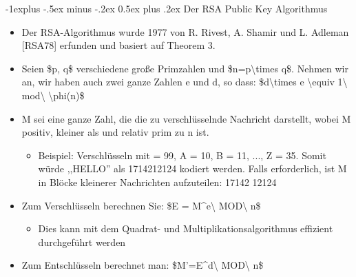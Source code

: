 \documentclass[a4paper]{article}
\makeatletter
\renewcommand{\subsection}{\@startsection{subsection}{2}{0mm}%
 {-1explus -.5ex minus -.2ex}%
 {0.5ex plus .2ex}%
 {\normalfont\normalsize\bfseries}}
\makeatother
\begin{document}
\begin{multicols}{3}
    \subsection{Der RSA Public Key
        Algorithmus}

    \begin{itemize}
        \item
              Der RSA-Algorithmus wurde 1977 von R. Rivest, A. Shamir und L. Adleman
              {[}RSA78{]} erfunden und basiert auf Theorem 3.
        \item
              Seien \$p, q\$ verschiedene große Primzahlen und
              \$n=p\textbackslash times q\$. Nehmen wir an, wir haben auch zwei
              ganze Zahlen e und d, so dass: \$d\textbackslash times e
              \textbackslash equiv 1\textbackslash{} mod\textbackslash{}
              \textbackslash phi(n)\$
        \item
              M sei eine ganze Zahl, die die zu verschlüsselnde Nachricht darstellt,
              wobei M positiv, kleiner als und relativ prim zu n ist.

              \begin{itemize}
                  \item
                        Beispiel: Verschlüsseln mit = 99, A = 10, B = 11, ..., Z = 35. Somit
                        würde ,,HELLO'' als 1714212124 kodiert werden. Falls erforderlich,
                        ist M in Blöcke kleinerer Nachrichten aufzuteilen: 17142 12124
              \end{itemize}
        \item
              Zum Verschlüsseln berechnen Sie: \$E = M\^{}e\textbackslash{}
              MOD\textbackslash{} n\$

              \begin{itemize}
                  \item
                        Dies kann mit dem Quadrat- und Multiplikationsalgorithmus effizient
                        durchgeführt werden
              \end{itemize}
        \item
              Zum Entschlüsseln berechnet man: \$M'=E\^{}d\textbackslash{}
              MOD\textbackslash{} n\$


\end{itemize}
\end{multicols}
\end{document}
